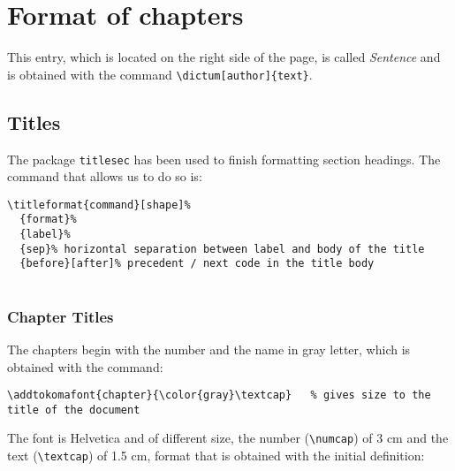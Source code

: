 \documentclass[a4paper,
                             twoside,
                             BCOR1.0cm,
                             DIV11,
                             parskip=full,
                             11pt]{scrbook}
\begin{document}
\title{}
\author{
    \\http://catalatex.blogspot.com/
}
\date{\today}

\maketitle
\tableofcontents

\chapter{Format of chapters}\label{cap:primer}

This entry, which is located on the right side of the page, is called \textit {Sentence} and is obtained with the command
 \verb+\dictum[author]{text}+.
\section{Titles}\label{sec:titles}
The package \verb+titlesec+ has been used to finish formatting section headings. The command that allows us to do so is:
\begin{scriptsize}
\begin{verbatim}
\titleformat{command}[shape]%
  {format}%
  {label}%
  {sep}% horizontal separation between label and body of the title
  {before}[after]% precedent / next code in the title body
 

\end{verbatim}
\end{scriptsize}

\subsection{Chapter Titles}\label{sbsec:captit}
The chapters begin with the number and the name in gray letter, which is obtained with the command:
\begin{scriptsize}
\begin{verbatim}
\addtokomafont{chapter}{\color{gray}\textcap}   % gives size to the title of the document
\end{verbatim}
\end{scriptsize}
The font is Helvetica and of different size, the number (\verb+\numcap+) of 3 cm and the text (\verb+\textcap+) of 1.5 cm, format that is obtained with the initial definition:
\end{document}
